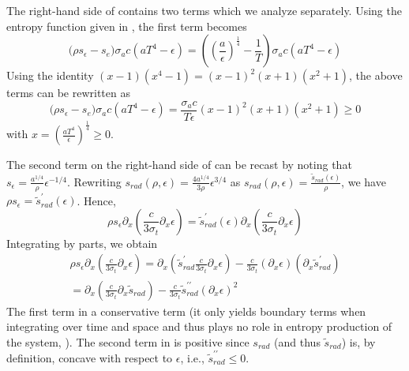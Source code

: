 \documentclass{mc2015}
\begin{document}
The right-hand side of  contains two terms which we analyze separately. Using the entropy function given in , the first term becomes
\begin{equation} 
\Big( \rho s_\epsilon -s_e \Big)  \sigma_a c \left( a T^4 - \epsilon \right) 
= \left( \left( \frac{a}{\epsilon}\right)^\frac{1}{4} - \frac{1}{T} \right)   \sigma_a c \left( a T^4 - \epsilon \right) 
\end{equation}
Using the identity $(x-1)(x^4-1) = (x-1)^2(x+1)(x^2+1)$, the above terms can be rewritten as
\begin{equation} 
\Big( \rho s_\epsilon -s_e \Big)  \sigma_a c \left( a T^4 - \epsilon \right) 
= \frac{\sigma_a c}{T \epsilon}  (x-1)^2(x+1)(x^2+1) \geq 0
\end{equation}
with $x=  \left(\frac{aT^4}{\epsilon}\right)^\frac{1}{4} \geq 0.$

The second term on the right-hand side of  can be recast by noting that $s_\epsilon = \frac{a^{1/4}}{\rho} \epsilon^{-1/4}$. Rewriting $s_{rad}(\rho, \epsilon) = \frac{4a^{1/4}}{3\rho} \epsilon^{3/4}$ as  $s_{rad}(\rho, \epsilon) = \frac{\tilde{s}_{rad}(\epsilon)}{\rho}$, we have
$ \rho s_\epsilon = \tilde{s}^\prime_{rad}(\epsilon)$. Hence, 
\begin{equation}
\rho s_\epsilon \partial_x \left( \frac{c}{3 \sigma_t} \partial_x \epsilon \right) 
=
 \tilde{s}^\prime_{rad}(\epsilon) \partial_x \left( \frac{c}{3 \sigma_t} \partial_x \epsilon \right) 
\end{equation}
%
Integrating by parts, we obtain
%
\begin{multline} \label{eq:final_form_second_term}
\rho s_\epsilon \partial_x \left( \frac{c}{3 \sigma_t} \partial_x \epsilon \right) 
=
 \partial_x \left(  \tilde{s}^\prime_{rad}  \frac{c}{3 \sigma_t} \partial_x \epsilon \right) 
-
\frac{c}{3 \sigma_t} \left(  \partial_x \epsilon \right)  \left( \partial_x \tilde{s}^\prime_{rad}  \right) \\
=
 \partial_x \left(   \frac{c}{3 \sigma_t} \partial_x \tilde{s}_{rad}  \right) 
-
\frac{c}{3 \sigma_t} \tilde{s}^{\prime\prime}_{rad}  \left(  \partial_x \epsilon \right)^2   \qquad  \qquad  \qquad \ 
\end{multline}
%
The first term in  a conservative term (it only yields boundary terms when integrating over time and space and thus plays no role in entropy production of the system, \cite{leveque}). The second term  in  is positive 
since $s_{rad}$ (and thus $\tilde{s}_{rad}$) is, by definition, concave with respect to $\epsilon$, i.e., $\tilde{s}^{\prime\prime}_{rad} \leq 0$.
\end{document}
